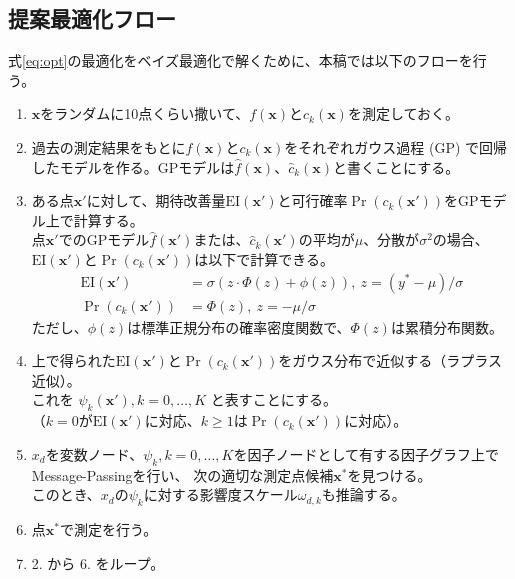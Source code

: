 \documentclass[oneside,onecolumn]{jlreq}
\theoremstyle{plain}
\begin{document}
\subsection{提案最適化フロー}
式\eqref{eq:opt}の最適化をベイズ最適化で解くために、本稿では以下のフローを行う。
\begin{enumerate}
    \item $\bm{x}$をランダムに10点くらい撒いて、$f(\bm{x})$と$c_k(\bm{x})$を測定しておく。
    \item 過去の測定結果をもとに$f(\bm{x})$と$c_k(\bm{x})$をそれぞれガウス過程 (GP) で回帰したモデルを作る。GPモデルは$\widehat{f}(\bm{x})$、$\widehat{c}_k(\bm{x})$と書くことにする。
    \item ある点$\bm{x}'$に対して、期待改善量$\mathrm{EI}(\bm{x}')$と可行確率$\Pr\left(c_k\left(\bm{x}'\right)\right)$をGPモデル上で計算する。\\
    点$\bm{x}'$でのGPモデル$\widehat{f}(\bm{x}')$または、$\widehat{c}_k(\bm{x}')$の平均が$\mu$、分散が$\sigma^2$の場合、
    $\mathrm{EI}(\bm{x}')$と$\Pr\left(c_k\left(\bm{x}'\right)\right)$は以下で計算できる。
    \begin{align}
        \mathrm{EI(\bm{x}')} &= \sigma\left(z\cdot\Phi\left(z\right)+\phi(z)\right),~z=(y^*-\mu)/\sigma \\
        \Pr\left(c_k\left(\bm{x}'\right)\right) &= \Phi(z),~z=-\mu/\sigma
    \end{align}
    ただし、$\phi(z)$は標準正規分布の確率密度関数で、$\Phi(z)$は累積分布関数。
    \item 上で得られた$\mathrm{EI(\bm{x}')}$と$\Pr\left(c_k\left(\bm{x}'\right)\right)$をガウス分布で近似する（ラプラス近似）。\\
    これを $\psi_k(\bm{x}'), k=0,\ldots,K$ と表すことにする。\\
    （$k=0$が$\mathrm{EI(\bm{x}')}$に対応、$k\geq 1$は$\Pr\left(c_k\left(\bm{x}'\right)\right)$に対応）。
    \item $x_d$を変数ノード、$\psi_k, k=0,\ldots,K$を因子ノードとして有する因子グラフ上でMessage-Passingを行い、
    次の適切な測定点候補$\bm{x}^*$を見つける。\\
    このとき、$x_d$の$\psi_k$に対する影響度スケール$\omega_{d,k}$も推論する。
    \item 点$\bm{x}^*$で測定を行う。
    \item 2. から 6. をループ。
\end{enumerate}
\end{document}
